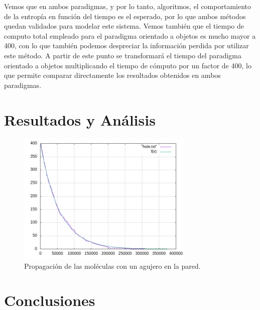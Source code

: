 \documentclass[12pt,twocolumn]{article}
\begin{document}
Vemos que en ambos paradigmas, y por lo tanto, algoritmos, el comportamiento de la entropía 
en función del tiempo es el esperado, por lo que ambos métodos quedan validados para modelar 
este sistema. Vemos también que el tiempo de computo total empleado para el paradigma orientado 
a objetos es mucho mayor a 400, con lo que también podemos despreciar la información perdida 
por utilizar este método. A partir de este punto se transformará el tiempo del paradigma 
orientado a objetos multiplicando el tiempo de cómputo por un factor de 400, lo que permite 
comparar directamente los resultados obtenidos en ambos paradigmas.

\section{Resultados y Análisis}

\begin{figure}
    \centering
    \includegraphics[width=0.75\textwidth]{figs/hole.png}
    \caption{Propagación de las moléculas con un agujero en la pared.}
    \label{fig:hole}
\end{figure}




\section{Conclusiones}
\end{document}
